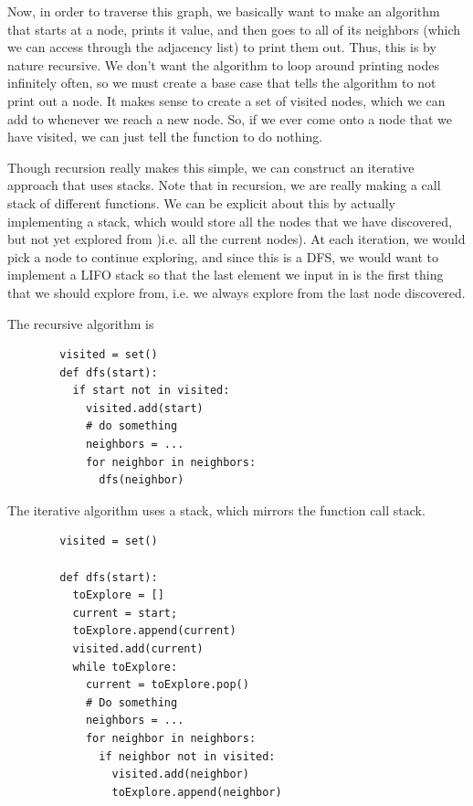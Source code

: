 \documentclass{article}
\begin{document}
    Now, in order to traverse this graph, we basically want to make an algorithm that starts at a node, prints it value, and then goes to all of its neighbors (which we can access through the adjacency list) to print them out. Thus, this is by nature recursive. We don't want the algorithm to loop around printing nodes infinitely often, so we must create a base case that tells the algorithm to not print out a node. It makes sense to create a set of visited nodes, which we can add to whenever we reach a new node. So, if we ever come onto a node that we have visited, we can just tell the function to do nothing. 

    Though recursion really makes this simple, we can construct an iterative approach that uses stacks. Note that in recursion, we are really making a call stack of different functions. We can be explicit about this by actually implementing a stack, which would store all the nodes that we have discovered, but not yet explored from )i.e. all the current nodes). At each iteration, we would pick a node to continue exploring, and since this is a DFS, we would want to implement a LIFO stack so that the last element we input in is the first thing that we should explore from, i.e. we always explore from the last node discovered. 

    \begin{definition}[DFS]
      The recursive algorithm is 
      \begin{lstlisting}
        visited = set() 
        def dfs(start): 
          if start not in visited: 
            visited.add(start) 
            # do something 
            neighbors = ... 
            for neighbor in neighbors: 
              dfs(neighbor)
      \end{lstlisting}

      The iterative algorithm uses a stack, which mirrors the function call stack. 
      \begin{lstlisting}
        visited = set() 

        def dfs(start): 
          toExplore = [] 
          current = start; 
          toExplore.append(current) 
          visited.add(current) 
          while toExplore: 
            current = toExplore.pop() 
            # Do something
            neighbors = ... 
            for neighbor in neighbors: 
              if neighbor not in visited: 
                visited.add(neighbor) 
                toExplore.append(neighbor)
      \end{lstlisting}
    \end{definition}
\end{document}
